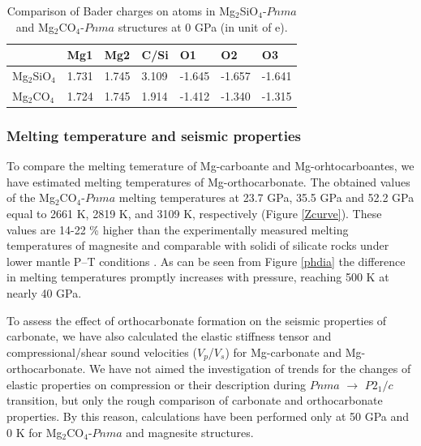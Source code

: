 \documentclass[a4paperm]{article}
\begin{document}
\begin{table}[h] \centering
	\caption{Comparison of Bader charges on atoms in Mg$_2$SiO$_4$-$Pnma$ and Mg$_2$CO$_4$-$Pnma$ structures at 0 GPa (in unit of e).} \vspace{2mm} \label{t:bader}
	\begin{tabular}{l l l l l l l }
        &       Mg1     &       Mg2     &       C/Si    &       O1      &       O2      &       O3      \\
		\hline
Mg$_2$SiO$_4$ &       1.731   &       1.745   &       3.109   &       -1.645  &       -1.657  &       -1.641  \\
Mg$_2$CO$_4$  &       1.724   &       1.745   &       1.914   &       -1.412  &       -1.340  &       -1.315  \\
		\hline 


	\end{tabular}
\end{table}


\subsubsection*{Melting temperature and seismic properties}
To compare the melting temerature of Mg-carboante and Mg-orhtocarboantes, we have estimated melting temperatures of Mg-orthocarbonate.
The obtained values of the Mg$_2$CO$_4$-$Pnma$ melting temperatures at 23.7 GPa, 35.5 GPa and 52.2 GPa equal to 2661 K, 2819 K, and 3109 K, respectively (Figure \ref{Zcurve}).
These values are 14-22 \% higher than the experimentally measured melting temperatures of magnesite and comparable with solidi of silicate rocks under lower mantle P--T conditions \cite{litasov2018_review}.
As can be seen from Figure \ref{phdia} the difference in melting temperatures promptly increases with pressure, reaching 500 K at nearly 40 GPa.



To assess the effect of orthocarbonate formation on the seismic properties of carbonate, we have also calculated the elastic stiffness tensor and compressional/shear sound velocities ($V_p$/$V_s$) for Mg-carbonate and Mg-orthocarbonate.
We have not aimed the investigation of trends for the changes of elastic properties on compression or their description during $Pnma$ $\to$ $P2_1/c$ transition, but only the rough comparison of carbonate and orthocarbonate properties.
By this reason, calculations have been performed only at 50 GPa and 0 K for Mg$_2$CO$_4$-$Pnma$ and magnesite structures.
\end{document}
